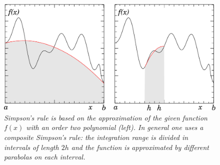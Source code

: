 \begin{figure}
  \centerline{\includegraphics[width=135mm]{figures/simpson}}
  \caption{\label{fig:simpson} \it Simpson's rule is based on the
    approximation of the given function $f(x)$ with an order two
    polynomial (left).  In general one uses a composite Simpson's
    rule: the integration range is divided in intervals of length $2
    h$ and the function is approximated by different parabolas on each
    interval.}
\end{figure}

